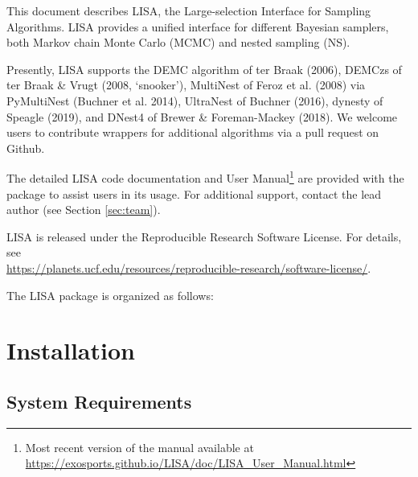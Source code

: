 \documentclass[letterpaper, 12pt]{article}
\begin{document}
\noindent This document describes LISA, the Large-selection Interface for 
Sampling Algorithms.  LISA provides a unified interface for different 
Bayesian samplers, both Markov chain Monte Carlo (MCMC) and nested sampling 
(NS).  \newline

\noindent Presently, LISA supports the 
DEMC algorithm of ter Braak (2006), 
DEMCzs of ter Braak \& Vrugt (2008, `snooker'), 
MultiNest of Feroz et al. (2008) via PyMultiNest (Buchner et al. 2014), 
UltraNest of Buchner (2016), 
dynesty of Speagle (2019), and 
DNest4 of Brewer & Foreman-Mackey (2018).  
We welcome users to contribute wrappers for additional 
algorithms via a pull request on Github. \newline

\noindent The detailed LISA code documentation and User Manual\footnote{Most recent version of the manual available at 
\href{https://exosports.github.io/LISA/doc/LISA_User_Manual.html}{https://exosports.github.io/LISA/doc/LISA\_User\_Manual.html}} 
are provided with the package to assist users in its usage. 
For additional support, contact the lead author (see Section \ref{sec:team}). \newline

\noindent LISA is released under the Reproducible Research Software License.  
For details, see \\
\href{https://planets.ucf.edu/resources/reproducible-research/software-license/}{https://planets.ucf.edu/resources/reproducible-research/software-license/}.\newline

\noindent The LISA package is organized as follows: \newline
\noindent{}
\vspace{0.7cm}

\section{Installation}
\label{sec:installation}

\subsection{System Requirements}
\label{sec:requirements}
\end{document}
